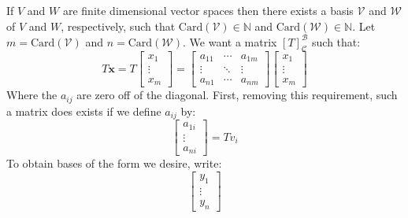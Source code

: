 \documentclass[crop=false,class=article]{standalone}                           %
\begin{document}
        \begin{solution}
            If $V$ and $W$ are finite dimensional vector spaces then there
            exists a basis $\mathcal{V}$ and $\mathcal{W}$ of $V$ and $W$,
            respectively, such that $\textrm{Card}(\mathcal{V})\in\mathbb{N}$
            and $\textrm{Card}(\mathcal{W})\in\mathbb{N}$. Let
            $m=\textrm{Card}(\mathcal{V})$ and $n=\textrm{Card}(\mathcal{W})$.
            We want a matrix $[T]_{\mathscr{C}}^{\mathscr{B}}$ such that:
            \begin{equation}
                T\mathbf{x}=T
                \begin{bmatrix}
                    x_{1}\\
                    \vdots\\
                    x_{m}
                \end{bmatrix}=
                \begin{bmatrix}
                    a_{11}&\cdots&a_{1m}\\
                    \vdots&\ddots&\vdots\\
                    a_{n1}&\cdots&a_{nm}
                \end{bmatrix}
                \begin{bmatrix}
                    x_{1}\\
                    \vdots\\
                    x_{m}
                \end{bmatrix}
            \end{equation}
            Where the $a_{ij}$ are zero off of the diagonal. First, removing
            this requirement, such a matrix does exists if we define
            $a_{ij}$ by:
            \begin{equation}
                \begin{bmatrix}
                    a_{1i}\\
                    \vdots\\
                    a_{ni}
                \end{bmatrix}=Tv_{i}
            \end{equation}
            To obtain bases of the form we desire, write:
            \begin{equation}
                \begin{bmatrix}
                    y_{1}\\
                    \vdots\\
                    y_{n}

\end{bmatrix}
\end{equation}
\end{solution}
\end{document}
